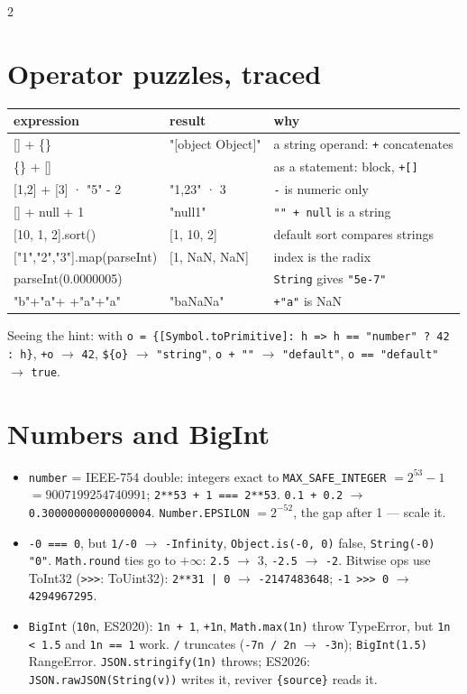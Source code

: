 \documentclass[8pt]{extarticle}
\newcommand\eqq{\hbox{=}\hbox{=}}
\newcommand\eqqq{\hbox{=}\hbox{=}\hbox{=}}
\newcommand\fat{\hbox{=}\hbox{>}}
\newcommand\ush{\hbox{>}\hbox{>}\hbox{>}}
\newcommand\pw{\hbox{*}\hbox{*}}
\newcommand\bq{\textasciigrave}
\newcommand\ct[1]{\texttt{#1}}
\begin{document}
\begin{multicols}{2}
\section{Operator puzzles, traced}
{\scriptsize\setlength{\tabcolsep}{2pt}\renewcommand{\arraystretch}{0.98}
\begin{tabular}{@{}>{\ttfamily}l>{\ttfamily}l>{\raggedright\arraybackslash}p{30mm}@{}}
\toprule
\normalfont\textbf{expression} & \normalfont\textbf{result} & \textbf{why}\\
\midrule
{}[] + \{\} & "[object Object]" & a string operand: \ct{+} concatenates\\
\{\} + [] & 0 & as a statement: block, \ct{+[]}\\
{}[1,2] + [3] · "5" - 2 & "1,23" · 3 & \ct{-} is numeric only\\
{}[] + null + 1 & "null1" & \ct{"" + null} is a string\\
{}[10, 1, 2].sort() & {}[1, 10, 2] & default sort compares strings\\
{}["1","2","3"].map(parseInt) & {}[1, NaN, NaN] & index is the radix\\
parseInt(0.0000005) & 5 & \ct{String} gives \ct{"5e-7"}\\
"b"+"a"+ +"a"+"a" & "baNaNa" & \ct{+"a"} is NaN\\
\bottomrule
\end{tabular}}\par
Seeing the hint: with \ct{o = \{[Symbol.toPrimitive]: h \fat{} h \eqq{} "number" ? 42 : h\}},
\ct{+o} $\to$ \ct{42}, \ct{\bq\$\{o\}\bq} $\to$ \ct{"string"}, \ct{o + ""} $\to$
\ct{"default"}, \ct{o \eqq{} "default"} $\to$ \ct{true}.

\columnbreak

\section{Numbers and BigInt}
\begin{itemize}
  \item \ct{number} = IEEE-754 double: integers exact to \ct{MAX\_SAFE\_INTEGER} $= 2^{53}-1$
        $= 9007199254740991$; \ct{2\pw53 + 1 \eqqq{} 2\pw53}. \ct{0.1 + 0.2} $\to$
        \ct{0.30000000000000004}. \ct{Number.EPSILON} $= 2^{-52}$, the gap after 1 — scale it.
  \item \ct{-0 \eqqq{} 0}, but \ct{1/-0} $\to$ \ct{-Infinity}, \ct{Object.is(-0, 0)} false,
        \ct{String(-0)} \ct{"0"}. \ct{Math.round} ties go to $+\infty$: \ct{2.5} $\to$ 3,
        \ct{-2.5} $\to$ \ct{-2}. Bitwise ops use ToInt32 (\ct{\ush}: ToUint32): \ct{2\pw31 | 0} $\to$
        \ct{-2147483648}; \ct{-1 \ush{} 0} $\to$ \ct{4294967295}.
  \item \ct{BigInt} (\ct{10n}, ES2020): \ct{1n + 1}, \ct{+1n}, \ct{Math.max(1n)} throw
        TypeError, but \ct{1n < 1.5} and \ct{1n \eqq{} 1} work. \ct{/} truncates
        (\ct{-7n / 2n} $\to$ \ct{-3n}); \ct{BigInt(1.5)} RangeError. \ct{JSON.stringify(1n)}
        throws; ES2026: \ct{JSON.rawJSON(String(v))} writes it, reviver \ct{\{source\}} reads it.
\end{itemize}


\end{multicols}
\end{document}
